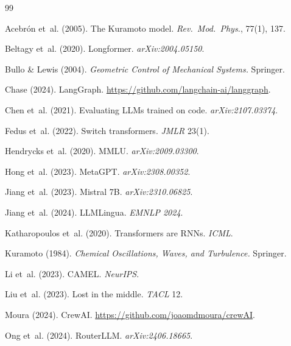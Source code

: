 \documentclass[10pt,twocolumn]{article}
\theoremstyle{plain}
\theoremstyle{definition}
\theoremstyle{remark}
\begin{document}

\begin{thebibliography}{99}\scriptsize

Acebrón et~al. (2005). The Kuramoto model. \emph{Rev.\ Mod.\ Phys.}, 77(1), 137.

Beltagy et~al. (2020). Longformer. \emph{arXiv:2004.05150}.

Bullo \& Lewis (2004). \emph{Geometric Control of Mechanical Systems.} Springer.

Chase (2024). LangGraph. \url{https://github.com/langchain-ai/langgraph}.

Chen et~al. (2021). Evaluating LLMs trained on code. \emph{arXiv:2107.03374}.

Fedus et~al. (2022). Switch transformers. \emph{JMLR} 23(1).

Hendrycks et~al. (2020). MMLU. \emph{arXiv:2009.03300}.

Hong et~al. (2023). MetaGPT. \emph{arXiv:2308.00352}.

Jiang et~al. (2023). Mistral 7B. \emph{arXiv:2310.06825}.

Jiang et~al. (2024). LLMLingua. \emph{EMNLP 2024}.

Katharopoulos et~al. (2020). Transformers are RNNs. \emph{ICML}.

Kuramoto (1984). \emph{Chemical Oscillations, Waves, and Turbulence.} Springer.

Li et~al. (2023). CAMEL. \emph{NeurIPS}.

Liu et~al. (2023). Lost in the middle. \emph{TACL} 12.

Moura (2024). CrewAI. \url{https://github.com/joaomdmoura/crewAI}.

Ong et~al. (2024). RouterLLM. \emph{arXiv:2406.18665}.


\end{thebibliography}
\end{document}

